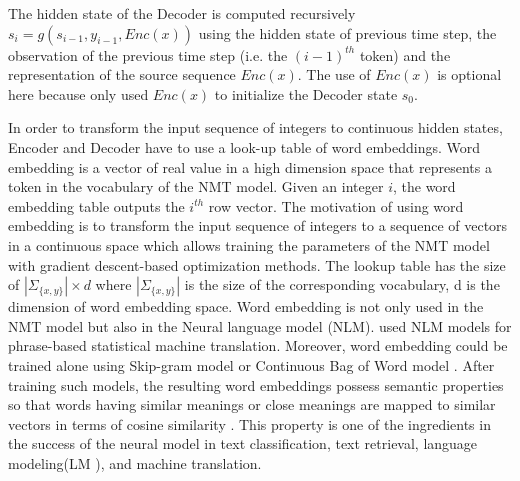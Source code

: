 The hidden state of the Decoder is computed recursively $s_i = g(s_{i-1},y_{i-1},Enc(x))$ using the hidden state of previous time step, the observation of the previous time step (i.e. the $(i-1)^{th}$ token) and the representation of the source sequence $Enc(x)$. The use of $Enc(x)$ is optional here because \cite{Sutskever14sequence} only used $Enc(x)$ to initialize the Decoder state $s_0$.

In order to transform the input sequence of integers to continuous hidden states, Encoder and Decoder have to use a look-up table of word embeddings. Word embedding is a vector of real value in a high dimension space that represents a token in the vocabulary of the NMT model. Given an integer $i$, the word embedding table outputs the $i^{th}$ row vector. The motivation of using word embedding is to transform the input sequence of integers to a sequence of vectors in a continuous space which allows training the parameters of the NMT model with gradient descent-based optimization methods. The lookup table has the size of $|\Sigma_{\{x,y\}}| \times d$ where $|\Sigma_{\{x,y\}}|$ is the size of the corresponding vocabulary, d is the dimension of word embedding space. Word embedding is not only used in the NMT model but also in the Neural language model \cite{Bengio03aneural}(NLM). \cite{Le12continuous, Schwenk12continuous} used NLM models for phrase-based statistical machine translation. Moreover, word embedding could be trained alone using Skip-gram model \citep{Mikolov13distributed} or Continuous Bag of Word model \cite{Mikolov13efficient}. After training such models, the resulting word embeddings possess semantic properties so that words having similar meanings or close meanings are mapped to similar vectors in terms of cosine similarity \citep{Collobert11natural, Mikolov13distributed, collobert08aunified}. This property is one of the ingredients in the success of the neural model in text classification, text retrieval, language modeling(LM ), and machine translation.
 

